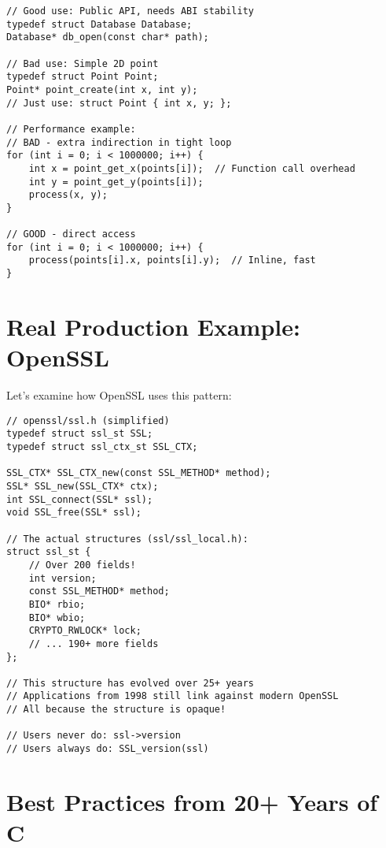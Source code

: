 \begin{lstlisting}
// Good use: Public API, needs ABI stability
typedef struct Database Database;
Database* db_open(const char* path);

// Bad use: Simple 2D point
typedef struct Point Point;
Point* point_create(int x, int y);
// Just use: struct Point { int x, y; };

// Performance example:
// BAD - extra indirection in tight loop
for (int i = 0; i < 1000000; i++) {
    int x = point_get_x(points[i]);  // Function call overhead
    int y = point_get_y(points[i]);
    process(x, y);
}

// GOOD - direct access
for (int i = 0; i < 1000000; i++) {
    process(points[i].x, points[i].y);  // Inline, fast
}
\end{lstlisting}

\section{Real Production Example: OpenSSL}

Let's examine how OpenSSL uses this pattern:

\begin{lstlisting}
// openssl/ssl.h (simplified)
typedef struct ssl_st SSL;
typedef struct ssl_ctx_st SSL_CTX;

SSL_CTX* SSL_CTX_new(const SSL_METHOD* method);
SSL* SSL_new(SSL_CTX* ctx);
int SSL_connect(SSL* ssl);
void SSL_free(SSL* ssl);

// The actual structures (ssl/ssl_local.h):
struct ssl_st {
    // Over 200 fields!
    int version;
    const SSL_METHOD* method;
    BIO* rbio;
    BIO* wbio;
    CRYPTO_RWLOCK* lock;
    // ... 190+ more fields
};

// This structure has evolved over 25+ years
// Applications from 1998 still link against modern OpenSSL
// All because the structure is opaque!

// Users never do: ssl->version
// Users always do: SSL_version(ssl)
\end{lstlisting}

\section{Best Practices from 20+ Years of C}

